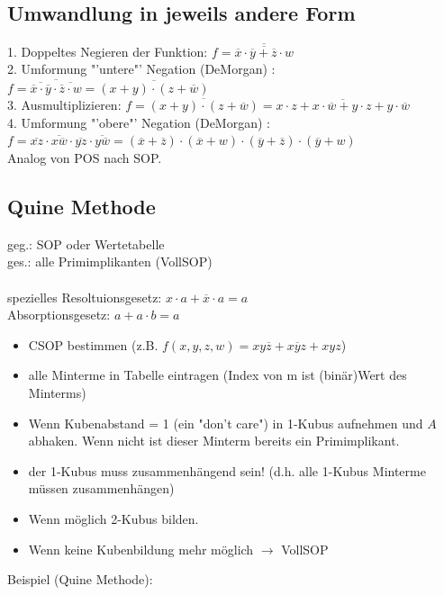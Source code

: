 \documentclass[6pt,a4paper]{scrartcl}
\newcommand{\ol}[1]{\ensuremath{\overline{#1}}}									%
\newcommand{\ra}[0]{\ensuremath{\rightarrow}} 									%
\begin{document}
\begin{multicols}{3}
\subsection{Umwandlung in jeweils andere Form}
1. Doppeltes Negieren der Funktion: $ f = \overline {\overline{\overline x \cdot \overline y + \overline z \cdot w}}$\\
2. Umformung "'untere"'  Negation (DeMorgan) : $ f = \ol{\ol{\ol x \cdot \ol y} \cdot \ol{\ol z \cdot w}} = \ol{(x+y) \cdot (z+\ol w)}$\\
3. Ausmultiplizieren: $ f = \ol{(x+y) \cdot (z+\ol w)} = \ol{x\cdot z + x\cdot \ol w + y \cdot z + y \cdot \ol w}$\\
4. Umformung "'obere"'  Negation (DeMorgan) :\\ $ f= \ol{xz} \cdot \ol{x \ol w} \cdot \ol{yz} \cdot \ol{y\ol w} = ( \ol x + \ol z) \cdot ( \ol x + w) \cdot ( \ol y + \ol z) \cdot ( \ol y + w)$\\
Analog von POS nach SOP.\\

\subsection{Quine Methode}
geg.: SOP oder Wertetabelle \\
ges.: alle Primimplikanten (VollSOP)  \\
\\
spezielles Resoltuionsgesetz: $x\cdot a + \overline x \cdot a = a$ \\
Absorptionsgesetz: $a + a\cdot b = a$

\begin{itemize}
	\item CSOP bestimmen (z.B. $f(x,y,z,w) = xy\overline z + x \overline y z + xyz$)
	\item alle Minterme in Tabelle eintragen (Index von m ist (binär)Wert des Minterms)
	\item Wenn Kubenabstand = 1 (ein "don't care") in 1-Kubus aufnehmen und $A$ abhaken. Wenn nicht ist dieser Minterm bereits ein Primimplikant.
	\item der 1-Kubus muss zusammenhängend sein! (d.h. alle 1-Kubus Minterme müssen zusammenhängen)
	\item Wenn möglich 2-Kubus bilden.
	\item Wenn keine Kubenbildung mehr möglich $\ra$ VollSOP
\end{itemize}
Beispiel (Quine Methode):


\end{multicols}
\end{document}
